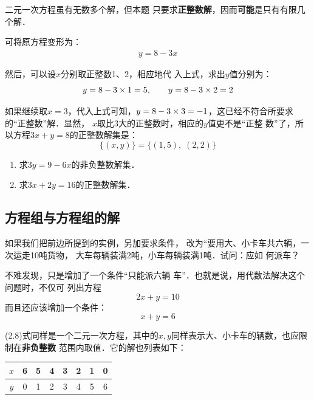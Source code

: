 \begin{analyze}
    二元一次方程虽有无数多个解，但本题
只要求\textbf{正整数解}，因而\textbf{可能}是只有有限几个解．
\end{analyze}

\begin{solution}
可将原方程变形为：
\begin{align*}
    y=8-3x   \tag{移项变号}
\end{align*}

  然后，可以设$x$分别取正整数1、2，相应地代
入上式，求出$y$值分别为：
\[y=8-3\times1=5, \qquad  y=8-3\times 2=2\]

    如果继续取$x=3$，代入上式可知，$y=8-3\times3=-1$，这已经不符合所要求的“正整数”解．显然，
$x$取比3大的正整数时，相应的$y$值更不是“正整
数”了，所以方程$3x +y=8$的正整数解集是：
\[\{(x,y)\}=\{(1,5),\; (2,2)\}  \]

\end{solution}

\begin{ex}
\begin{enumerate}
    \item 求$3y=9-6x$的非负整数解集．
    \item 求$3x+2y=16$的正整数解集．
\end{enumerate}
\end{ex}
          
\subsection{方程组与方程组的解}
    如果我们把前边所提到的实例，另加要求条件，
改为“要用大、小卡车共六辆，一次运走10吨货物，
大车每辆装满2吨，小车每辆装满1吨．试问：应如
何派车？

    不难发现，只是增加了一个条件“只能派六辆
车”．也就是说，用代数法解决这个问题时，不仅可
列出方程
\begin{equation}
    2x+y=10
\end{equation}
而且还应该增加一个条件：
\begin{equation}
    x+y=6
\end{equation}

(2.8)式同样是一个二元一次方程，其中的$x,y$同样表示大、小卡车的辆数，也应限制在\textbf{非负整数}
范围内取值．它的解也列表如下：
\begin{center}
    \begin{tabular}{c|ccccccc}
        \hline
$x$ &6&5&4&3&2&1&0\\
\hline
$y$ &0&1&2&3&4&5&6 \\
\hline      
    \end{tabular}
\end{center}

